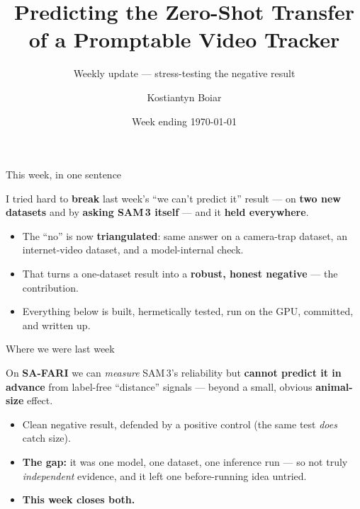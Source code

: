\documentclass[aspectratio=169,11pt]{beamer}
\title[Weekly update]{Predicting the Zero-Shot Transfer of a Promptable Video Tracker}
\subtitle{Weekly update --- stress-testing the negative result}
\author{Kostiantyn Boiar}
\institute{MSc Dissertation \,\textbullet\, University of Glasgow\\[2pt]
\small Supervisor: Dr Marwa Mahmoud}
\date{Week ending \today}
\begin{document}
\begin{frame}[plain]\titlepage\end{frame}

\begin{frame}{This week, in one sentence}
  \begin{block}{}
    \centering\large
    I tried hard to \textbf{break} last week's ``we can't predict it'' result --- on \textbf{two new datasets}
    and by \textbf{asking SAM\,3 itself} --- and it \textbf{held everywhere}.
  \end{block}
  \vspace{0.6em}
  \begin{itemize}\footnotesize
    \item The ``no'' is now \textbf{triangulated}: same answer on a camera-trap dataset, an internet-video
          dataset, and a model-internal check.
    \item That turns a one-dataset result into a \textbf{robust, honest negative} --- the contribution.
    \item Everything below is built, hermetically tested, run on the GPU, committed, and written up.
  \end{itemize}
\end{frame}

\begin{frame}{Where we were last week}
  \begin{block}{}\centering
    On \textbf{SA-FARI} we can \emph{measure} SAM\,3's reliability but \textbf{cannot predict it in advance}
    from label-free ``distance'' signals --- beyond a small, obvious \textbf{animal-size} effect.
  \end{block}
  \vspace{0.5em}
  \begin{itemize}\footnotesize
    \item Clean negative result, defended by a positive control (the same test \emph{does} catch size).
    \item \textbf{The gap:} it was one model, one dataset, one inference run --- so not truly \emph{independent}
          evidence, and it left one before-running idea untried.
    \item \textbf{This week closes both.}
  \end{itemize}
\end{frame}
\end{document}
